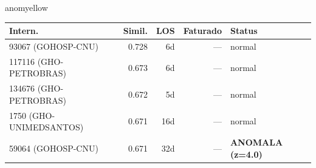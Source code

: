 \documentclass[a4paper,10pt]{article}
\begin{document}
\begin{anomalycard}[Internacao 221 | GHO-ASFEB | MODERADO (z=2.20)]{anomyellow}
\begin{tabular}{l r r r l}\toprule\textbf{Intern.} & \textbf{Simil.} & \textbf{LOS} & \textbf{Faturado} & \textbf{Status} \\\midrule
93067 (GOHOSP-CNU) & 0.728 & 6d & --- & \textcolor{jcubeblue}{normal} \\
117116 (GHO-PETROBRAS) & 0.673 & 6d & --- & \textcolor{jcubeblue}{normal} \\
134676 (GHO-PETROBRAS) & 0.672 & 5d & --- & \textcolor{jcubeblue}{normal} \\
1750 (GHO-UNIMEDSANTOS) & 0.671 & 16d & --- & \textcolor{jcubeblue}{normal} \\
59064 (GOHOSP-CNU) & 0.671 & 32d & --- & \textcolor{anomred}{\textbf{ANOMALA (z=4.0)}} \\
\bottomrule\end{tabular}


\end{anomalycard}

\newpage
\end{document}
